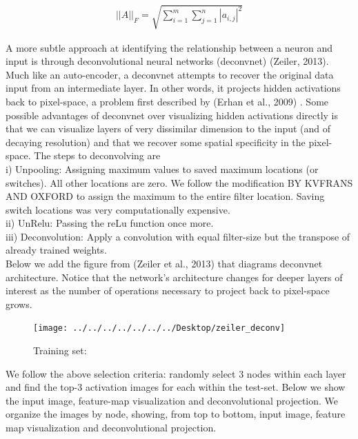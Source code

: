 \documentclass[12pt]{article}
\begin{document}
\begin{align*}
	||A||_F = \sqrt{\sum_{i = 1}^{m} \sum_{j = 1}^{n} |a_{i,j}|^2}
\end{align*}

A more subtle approach at identifying the relationship between a neuron and input is through deconvolutional neural networks (deconvnet) (Zeiler, 2013)\cite{zeiler}. Much like an auto-encoder, a deconvnet attempts to recover the original data input from an intermediate layer. In other words, it projects hidden activations back to pixel-space, a problem first described by (Erhan et al., 2009) \cite{bengio}. Some possible advantages of deconvnet over visualizing hidden activations directly is that we can visualize layers of very dissimilar dimension to the input (and of decaying resolution) and that we recover some spatial specificity in the pixel-space. The steps to deconvolving are \\

i) Unpooling: Assigning maximum values to saved maximum locations (or switches). All other locations are zero. We follow the modification BY KVFRANS AND OXFORD to assign the maximum to the entire filter location. Saving switch locations was very computationally expensive. \\

ii) UnRelu: Passing the reLu function once more. \\

iii) Deconvolution: Apply a convolution with equal filter-size but the transpose of already trained weights. \\

Below we add the figure from (Zeiler et al., 2013) that diagrams deconvnet architecture. Notice that the network's architecture changes for deeper layers of interest as the number of operations necessary to project back to pixel-space grows. \\

\begin{figure} [H]
	\centering
	\texttt{[image: ../../../../../../../Desktop/zeiler\_deconv]}
	\caption{Training set:}
	\label{fig:zeilerdeconv}
\end{figure}

We follow the above selection criteria: randomly select 3 nodes within each layer and find the top-3 activation images for each within the test-set. Below we show the input image, feature-map visualization and deconvolutional projection. We organize the images by node, showing, from top to bottom, input image,  feature map visualization and deconvolutional projection.
\end{document}
